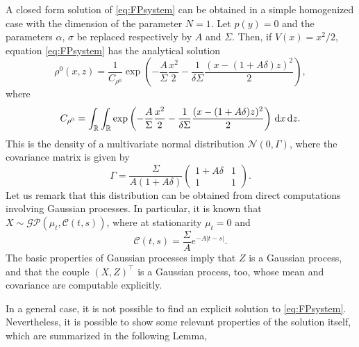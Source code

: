 \documentclass[10pt]{article}
\begin{document}
\begin{example}\label{ex:OrnUhl} A closed form solution of \eqref{eq:FPsystem} can be obtained in a simple homogenized case with the dimension of the parameter $N=1$. Let $p(y) = 0$ and the parameters $\alpha$, $\sigma$ be replaced respectively by $A$ and $\Sigma$. Then, if $V(x) = x^2/2$, equation \eqref{eq:FPsystem} has the analytical solution 
\begin{equation}
\rho^0(x,z) = \frac{1}{C_{\rho^0}} \exp\left(-\frac{A}{\Sigma} \frac{x^2}{2} - \frac{1}{\delta \Sigma} \frac{(x - (1+A \delta)z)^2}{2}\right),
\end{equation}
where
\begin{equation}
C_{\rho^0} = \int_{\mathbb{R}} \int_{\mathbb{R}} \exp\left(-\frac{A}{\Sigma} \frac{x^2}{2} - \frac{1}{\delta \Sigma} \frac{(x - (1+A \delta)z)^2}{2}\right) \,\mathrm{d} x \,\mathrm{d} z.
\end{equation}
This is the density of a multivariate normal distribution $\mathcal N(0, \Gamma)$, where the covariance matrix is given by
\begin{equation}
\Gamma = \frac{\Sigma}{A (1 + A\delta)} \begin{pmatrix} 1+A\delta & 1 \\ 1 & 1 \end{pmatrix}.
\end{equation}
Let us remark that this distribution can be obtained from direct computations involving Gaussian processes. In particular, it is known that $X \sim \mathcal{GP}(\mu_t, \mathcal C(t, s))$, where at stationarity $\mu_t = 0$ and
\begin{equation}
	\mathcal C(t, s) = \frac{\Sigma}{A} e^{-A|t-s|}.
\end{equation}
The basic properties of Gaussian processes imply that $Z$ is a Gaussian process, and that the couple $(X, Z)^\top$ is a Gaussian process, too, whose mean and covariance are computable explicitly.
\end{example}

In a general case, it is not possible to find an explicit solution to \eqref{eq:FPsystem}. Nevertheless, it is possible to show some relevant properties of the solution itself, which are summarized in the following Lemma, 
\end{document}
